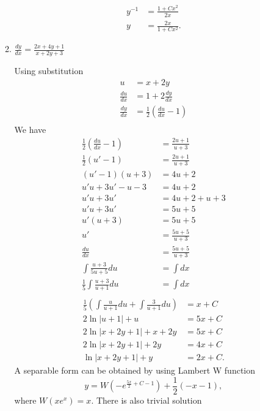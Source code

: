 \documentclass{zc-ust-hw}
\begin{document}
\begin{enumerate}
\begin{enumerate}
\begin{sol}
\begin{align}
            y^{-1}&=\frac{1+Cx^2}{2x}\\
            y&=\frac{2x}{1+Cx^2}
          .\end{align}
        \end{sol}
      \item $\frac{d y}{d x}=\frac{2 x+4 y+1}{x+2 y+3}$
        \begin{sol} Using substitution
          \begin{align}
            u&=x+2y\\
            \frac{du}{dx}&=1+2\frac{dy}{dx}\\
            \frac{dy}{dx}&=\frac{1}{2}\left(\frac{du}{dx}-1\right)\\
          \end{align}
            We have
            \begin{align}
            \frac{1}{2}\left(\frac{du}{dx}-1\right)&=\frac{2u+1}{u+3}\\
            \frac{1}{2}\left(u'-1\right)&=\frac{2u+1}{u+3}\\
            (u'-1)(u+3)&=4u+2\\
            u'u+3u'-u-3&=4u+2\\
            u'u+3u'&=4u+2+u+3\\
            u'u+3u'&=5u+5\\
            u'(u+3)&=5u+5\\
            u'&=\frac{5u+5}{u+3}\\
            \frac{du}{dx}&=\frac{5u+5}{u+3}\\
            \int \frac{u+3}{5u+5} du&=\int dx\\
            \frac{1}{5} \int \frac{u+3}{u+1} du&=\int dx\\
          \end{align}
          \begin{align}
            \frac{1}{5} \left( \int \frac{u}{u+1} du + \int \frac{3}{u+1} du \right) &= x + C \\
            2\ln |u+1|+u &= 5x + C \\
            2\ln |x+2y+1|+x+2y &= 5x + C \\
            2\ln |x+2y+1|+2y &= 4x + C \\
            \ln |x+2y+1|+y &= 2x + C
          .\end{align}
          A separable form can be obtained by using Lambert W function
          \[
            y = W\left(-e^{\frac{5x}{2} + C - 1}\right) + \frac{1}{2}(-x - 1)
          ,\] 
          where \( W(xe^{x} )=x \). There is also trivial solution

\end{sol}
\end{enumerate}
\end{enumerate}
\end{document}
